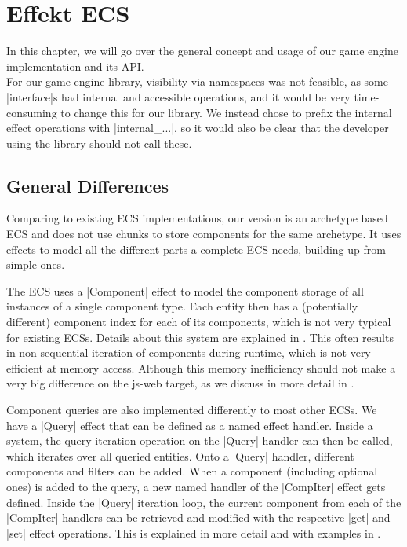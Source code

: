 \chapter{Effekt ECS}\label{chap:engine}

In this chapter, we will go over the general concept and usage of our game engine implementation and its API.\\
For our game engine library, visibility via namespaces was not feasible, as some |interface|s had internal and accessible operations, and it would be very time-consuming to change this for our library. We instead chose to prefix the internal effect operations with |internal_...|, so it would also be clear that the developer using the library should not call these.

\section{General Differences}

Comparing to existing ECS implementations, our version is an archetype based ECS and does not use chunks to store components for the same archetype. It uses effects to model all the different parts a complete ECS needs, building up from simple ones.

The ECS uses a |Component| effect to model the component storage of all instances of a single component type. Each entity then has a (potentially different) component index for each of its components, which is not very typical for existing ECSs. Details about this system are explained in . This often results in non-sequential iteration of components during runtime, which is not very efficient at memory access. Although this memory inefficiency should not make a very big difference on the \textsf{js-web} target, as we discuss in more detail in .

Component queries are also implemented differently to most other ECSs. We have a |Query| effect that can be defined as a named effect handler. Inside a system, the query iteration operation on the |Query| handler can then be called, which iterates over all queried entities. Onto a |Query| handler, different components and filters can be added. When a component (including optional ones) is added to the query, a new named handler of the |CompIter| effect gets defined. Inside the |Query| iteration loop, the current component from each of the |CompIter| handlers can be retrieved and modified with the respective |get| and |set| effect operations. This is explained in more detail and with examples in .

